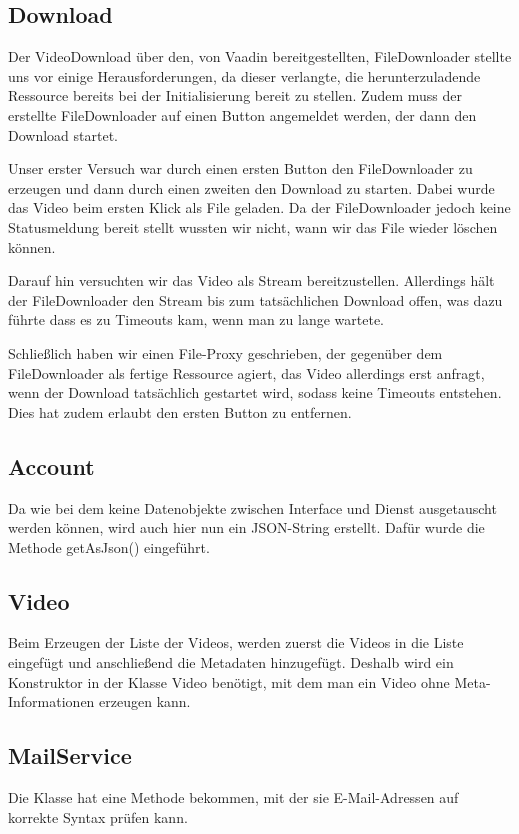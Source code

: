 \subsection{Download} \label{sec:Download}
Der VideoDownload über den, von Vaadin bereitgestellten, FileDownloader stellte uns vor einige Herausforderungen, da dieser verlangte, die herunterzuladende Ressource bereits bei der Initialisierung bereit zu stellen. Zudem muss der erstellte FileDownloader auf einen Button angemeldet werden, der dann den Download startet. \par
Unser erster Versuch war durch einen ersten Button den FileDownloader zu erzeugen und dann durch einen zweiten den Download zu starten. Dabei wurde das Video beim ersten Klick als File geladen. Da der FileDownloader jedoch keine Statusmeldung bereit stellt wussten wir nicht, wann wir das File wieder löschen können. \par
Darauf hin versuchten wir das Video als Stream bereitzustellen. Allerdings hält der FileDownloader den Stream bis zum tatsächlichen Download offen, was dazu führte dass es zu Timeouts kam, wenn man zu lange wartete. \par
Schließlich haben wir einen File-Proxy geschrieben, der gegenüber dem FileDownloader als fertige Ressource agiert, das Video allerdings erst anfragt, wenn der Download tatsächlich gestartet wird, sodass keine Timeouts entstehen. Dies hat zudem erlaubt den ersten Button zu entfernen.

\subsection{Account}
Da wie bei dem  keine Datenobjekte zwischen Interface und Dienst ausgetauscht werden können, wird auch hier nun ein JSON-String erstellt. Dafür wurde die Methode getAsJson() eingeführt.

\subsection{Video}
Beim Erzeugen der Liste der Videos, werden zuerst die Videos in die Liste eingefügt und anschließend die Metadaten hinzugefügt. Deshalb wird ein Konstruktor in der Klasse Video benötigt, mit dem man ein Video ohne Meta-Informationen erzeugen kann.

\subsection{MailService}
Die Klasse hat eine Methode bekommen, mit der sie E-Mail-Adressen auf korrekte Syntax prüfen kann.